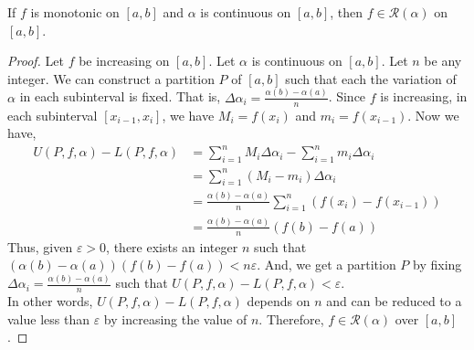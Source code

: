 \begin{theorem}
	If $f$ is monotonic on $[a,b]$ and $\alpha$ is continuous on $[a,b]$, then $f \in \mathscr{R}(\alpha)$ on $[a,b]$.
\end{theorem}
\begin{proof}
	Let $f$ be increasing on $[a,b]$.
	Let $\alpha$ is continuous on $[a,b]$.
	Let $n$ be any integer.
	We can construct a partition $P$ of $[a,b]$ such that each the variation of $\alpha$ in each subinterval is fixed.
	That is, $\Delta \alpha_i = \frac{\alpha(b)-\alpha(a)}{n}$.
	Since $f$ is increasing, in each subinterval $[x_{i-1},x_i]$, we have $M_i = f(x_i)$ and $m_i = f(x_{i-1})$.
	Now we have,
	\begin{align*}
	U(P,f,\alpha) - L(P,f,\alpha) 
		& = \sum_{i=1}^n M_i \Delta \alpha_i - \sum_{i=1}^n m_i \Delta \alpha_i \\
		& = \sum_{i=1}^n (M_i-m_i) \Delta \alpha_i \\
		& = \frac{\alpha(b)-\alpha(a)}{n} \sum_{i=1}^n (f(x_i) - f(x_{i-1})) \\
		& = \frac{\alpha(b)-\alpha(a)}{n} (f(b)-f(a))
	\end{align*}
	Thus, given $\varepsilon > 0$, there exists an integer $n$ such that $ (\alpha(b)-\alpha(a))(f(b)-f(a)) < n\varepsilon $.
	And, we get a partition $P$ by fixing $\Delta \alpha_i = \frac{\alpha(b)-\alpha(a)}{n}$ such that $ U(P,f,\alpha)-L(P,f,\alpha) < \varepsilon $.\\

	In other words, $U(P,f,\alpha)-L(P,f,\alpha)$ depends on $n$ and can be reduced to a value less than $\varepsilon$ by increasing the value of $n$.
	Therefore, $f \in \mathscr{R}(\alpha)$ over $[a,b]$.
\end{proof}

